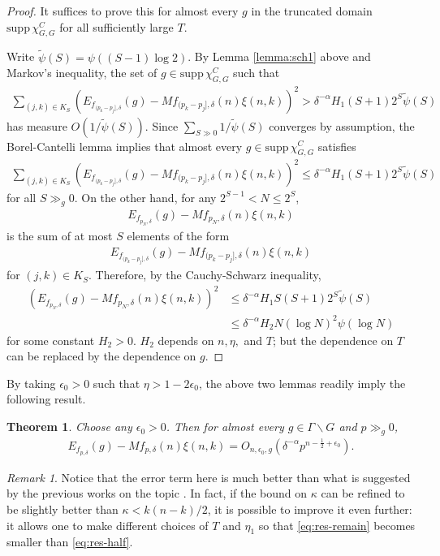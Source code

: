 \documentclass[11pt]{amsart}
\newtheorem{theorem}{Theorem}
\numberwithin{theorem}{section}
\numberwithin{equation}{section}
\theoremstyle{remark}
\newtheorem*{remark}{Remark}
\theoremstyle{definition}
\begin{document}
\begin{proof}
It suffices to prove this for almost every $g$ in the truncated domain $\mathrm{supp}\,\chi^C_{G,G}$ for all sufficiently large $T$.

Write $\tilde\psi(S) = \psi((S-1)\log 2)$. By Lemma \ref{lemma:sch1} above and Markov's inequality, the set of $g \in \mathrm{supp}\,\chi^C_{G,G}$ such that
\begin{align*}
\sum_{(j,k)\in K_S}\left(E_{f_{(p_k-p_j],\delta}}(g) - Mf_{(p_k-p_j],\delta}(n)\xi(n,k)\right)^2 > \delta^{-\alpha}H_1(S+1)2^S\tilde\psi(S)
\end{align*}
has measure $O(1/\tilde\psi(S))$. Since $\sum_{S \gg 0} 1/\tilde\psi(S)$ converges by assumption, the Borel-Cantelli lemma implies that almost every $g \in \mathrm{supp}\,\chi^C_{G,G}$ satisfies
\begin{align*}
\sum_{(j,k)\in K_S}\left(E_{f_{(p_k-p_j],\delta}}(g) - Mf_{(p_k-p_j],\delta}(n)\xi(n,k)\right)^2 \leq \delta^{-\alpha}H_1(S+1)2^S\tilde\psi(S)
\end{align*}
for all $S \gg_g 0$. On the other hand, for any $2^{S-1} < N \leq 2^S$,
\begin{align*}
E_{f_{p_N,\delta}}(g) - Mf_{p_N,\delta}(n)\xi(n,k)
\end{align*}
is the sum of at most $S$ elements of the form
\begin{align*}
E_{f_{(p_k-p_j],\delta}}(g) - Mf_{(p_k-p_j],\delta}(n)\xi(n,k)
\end{align*}
for $(j,k)\in K_S$. Therefore, by the Cauchy-Schwarz inequality,
\begin{align*}
\left(E_{f_{p_N,\delta}}(g) - Mf_{p_N,\delta}(n)\xi(n,k)\right)^2 &\leq \delta^{-\alpha}H_1S(S+1)2^S\tilde\psi(S) \\
&\leq \delta^{-\alpha}H_2N(\log N)^2\psi(\log N)
\end{align*}
for some constant $H_2 > 0$. $H_2$ depends on $n,\eta,$ and $T$; but the dependence on $T$ can be replaced by the dependence on $g$.
\end{proof}


By taking $\epsilon_0 >0$ such that $\eta>1-2\epsilon_0$, the above two lemmas readily imply the following result.
\begin{theorem} \label{thm:grass_smooth}
Choose any $\epsilon_0 > 0$. Then for almost every $g \in \Gamma\backslash G$ and $p \gg_{g} 0$,
\begin{align*}
E_{f_{p,\delta}}(g) - Mf_{p,\delta}(n)\xi(n,k) = O_{n,\epsilon_0,g}\left(\delta^{-\alpha}p^{n-\frac{1}{2}+\epsilon_0}\right).
\end{align*}
\end{theorem}
\begin{remark}
Notice that the error term here is much better than what is suggested by the previous works on the topic \cite{Sch68, Thu93, Kim23}. In fact, if the bound on $\kappa$ can be refined to be slightly better than $\kappa < k(n-k)/2$, it is possible to improve it even further: it allows one to make different choices of $T$ and $\eta_1$ so that \eqref{eq:res-remain} becomes smaller than \eqref{eq:res-half}.
\end{remark}
\end{document}
